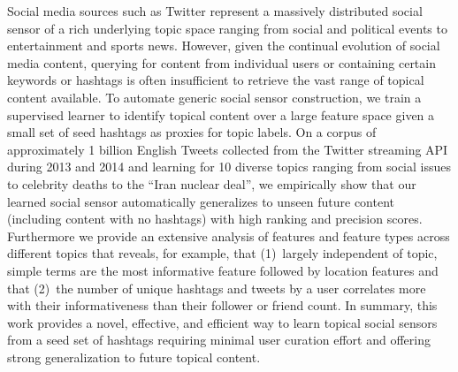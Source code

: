 Social media sources such as Twitter represent a massively distributed
social sensor of a rich underlying topic space ranging from social and
political events to entertainment and sports news.  However, given the
continual evolution of social media content, querying for content from
individual users or containing certain keywords or hashtags is often
insufficient to retrieve the vast range of topical content available.
To automate generic social sensor construction, we
train a supervised learner to identify topical content over a large
feature space given a small set of seed hashtags as proxies for
topic labels.  On a corpus of approximately 1 billion
English Tweets
collected from the Twitter
streaming API during 2013 and 2014 and learning for 10 diverse topics
ranging from social issues to celebrity deaths to the ``Iran nuclear
deal'', we empirically show that our learned social sensor
automatically generalizes to unseen future content (including content
with no hashtags) with high ranking and precision scores.  Furthermore
we provide an extensive analysis of features and feature types across
different topics that reveals, for example, that (1)~largely
independent of topic, simple terms are the most informative feature
followed by location features and that (2)~the number of unique
hashtags and tweets by a user correlates more with their
informativeness than their follower or friend count.  In summary, this
work provides a novel, effective, and efficient way to learn topical
social sensors from a seed set of hashtags requiring minimal user
curation effort and offering strong generalization to future topical content.


